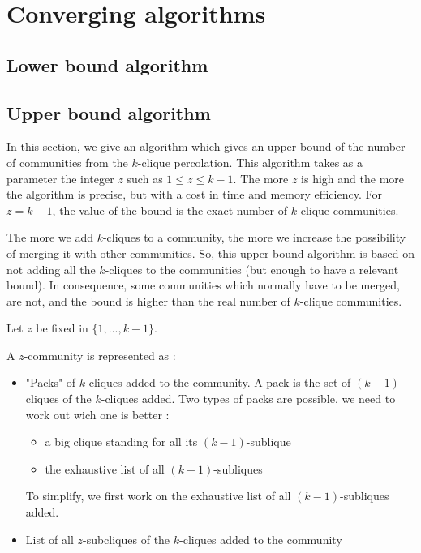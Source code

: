 \section{Converging algorithms}

\subsection{Lower bound algorithm}



\subsection{Upper bound algorithm}

In this section, we give an algorithm which gives an upper bound of the number of communities from the $k$-clique percolation. This algorithm takes as a parameter the integer $z$ such as $1 \leq z \leq k-1$. The more $z$ is high and the more the algorithm is precise, but with a cost in time and memory efficiency. For $z=k-1$, the value of the bound is the exact number of $k$-clique communities.

The more we add $k$-cliques to a community, the more we increase the possibility of merging it with other communities. So, this upper bound algorithm is based on not adding all the $k$-cliques to the communities (but enough to have a relevant bound). In consequence, some communities which normally have to be merged, are not, and the bound is higher than the real number of $k$-clique communities.

Let $z$ be fixed in $\{1,...,k-1\}$.

A $z$-community is represented as :
\begin{itemize}
\item "Packs" of $k$-cliques added to the community. A pack is the set of $(k-1)$-cliques of the $k$-cliques added. Two types of packs are possible, we need to work out wich one is better :
  \begin{itemize}
  \item a big clique standing for all its $(k-1)$-sublique
  \item the exhaustive list of all $(k-1)$-subliques
  \end{itemize}

  To simplify, we first work on the exhaustive list of all $(k-1)$-subliques added.

\item List of all $z$-subcliques of the $k$-cliques added to the community 
\end{itemize}


